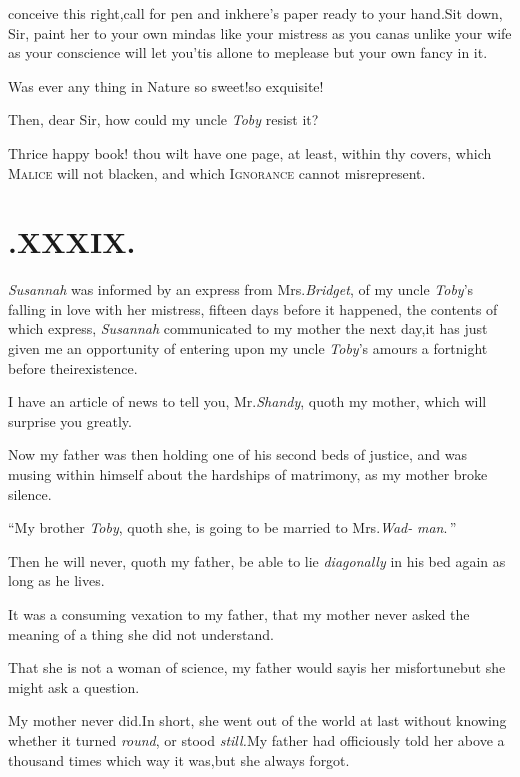 \documentclass{article}
\begin{document}
 conceive this right,\tsk call
for pen and ink\tsk here’s paper ready to your
hand.\tsh Sit down, Sir, paint her to your own
mind\tsh as like your mistress as you can\tsh as
unlike your wife as your conscience will let you\tsk ’tis
all\break one to me\tsh please but your own fancy in it.

\newpage
\hbox{}
\newpage
\tsh Was ever any thing in Nature so sweet!\tsk so
exquisite!

\tsh Then, dear Sir, how could my uncle \textit{Toby}
resist it?

Thrice happy book! thou wilt have one page, at least, within thy
covers, which \textsc{Malice} will not blacken, and which
\textsc{Ignorance} cannot misrepresent.

\section{.\enspace XXXIX.}

 \textit{Susannah} was informed by an
express from Mrs.\@ \textit{Bridget}, of my\break
uncle \textit{Toby}’s falling in love with her\break
mistress, fifteen days before it happened,\break
\tsk the contents of which express, \textit{Susan\-nah}
communicated to my mother the next day,\tsk it has just given me
an op\-portunity of entering upon my uncle \textit{Toby}’s amours
a fortnight before their\break existence.

I have an article of news to tell you, Mr.\@ \textit{Shandy}, quoth
my mother, which will surprise you greatly.\tsh

Now my father was then holding one of his second beds of
justice, and was musing within himself about the hardships of
matrimony, as my mother broke silence.\tsh

“\tsk My brother \textit{Toby}, quoth she,\break
\lqq is going to be married to Mrs.\@ \textit{Wad-}\break
\lqq \textit{man}.\,”

\tsh Then he will never, quoth my father, be able to
lie \textit{diagonally} in his bed again as long as he lives.

It was a consuming vexation to my father, that my mother never
asked the meaning of a thing she did not understand.

\tsh That she is not a woman of science, my father
would say\tsk is her misfortune\tsk but she might ask a
question.\tsk 

My mother never did.\tsh In short, she went out of the
world at last without knowing whether it turned \textit{round}, or
stood \textit{still.}\tsh My father had officiously told her
above a thousand times which way it was,\tsk but she always
forgot.
\end{document}
